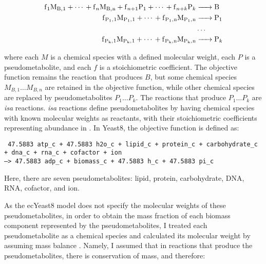 \begin{equation}
  \begin{aligned}
    \ce{f_{1}M_{B,1} + \cdots{} + f_{n}M_{B,n} + f_{n+1}P1 + \cdots{} + f_{n+k}P_{k} &-> B}\\
    \ce{f_{P_{1},1}M_{P_{1},1} + \cdots{} + f_{P_{1},n}M_{P_{1},n} &-> P1}\\
    &\ldots\\
    \ce{f_{P_{k},1}M_{P_{k},1} + \cdots{} + f_{P_{k},n}M_{P_{k},n} &-> P_{k}}
    \label{eq:model-pseudometabolites}
  \end{aligned}
\end{equation}

where each $M$ is a chemical species with a defined molecular weight, each $P$ is a pseudometabolite, and each $f$ is a stoichiometric coefficient.
The objective function remains the reaction that produces $B$, but some chemical species $M_{B,1} \ldots M_{B,n}$ are retained in the objective function, while other chemical species are replaced by pseudometabolites $P_{1} \ldots P_{k}$.
The reactions that produce $P_{1} \ldots P_{k}$ are \textit{isa} reactions.
\textit{isa} reactions define pseudometabolites by having chemical species with known molecular weights as reactants, with their stoichiometric coefficients representing abundance in \SI{}{\mmolgdw}.
In Yeast8, the objective function is defined as:

\texttt{
  47.5883 atp\_c + 47.5883 h2o\_c + lipid\_c + protein\_c + carbohydrate\_c\\
  + dna\_c + rna\_c + cofactor + ion \\
  --> 47.5883 adp\_c + biomass\_c + 47.5883 h\_c + 47.5883 pi\_c
}

Here, there are seven pseudometabolites: lipid, protein, carbohydrate, DNA, RNA, cofactor, and ion.

As the ecYeast8 model does not specify the molecular weights of these pseudometabolites, in order to obtain the mass fraction of each biomass component represented by the pseudometabolites,
I treated each pseudometabolite as a chemical species and calculated its molecular weight by assuming mass balance \parencite{chanStandardizingBiomassReactions2017, dinhQuantifyingPropagationParametric2022, takhaveevTemporalSegregationBiosynthetic2023}.
Namely, I assumed that in reactions that produce the pseudometabolites, there is conservation of mass, and therefore:


